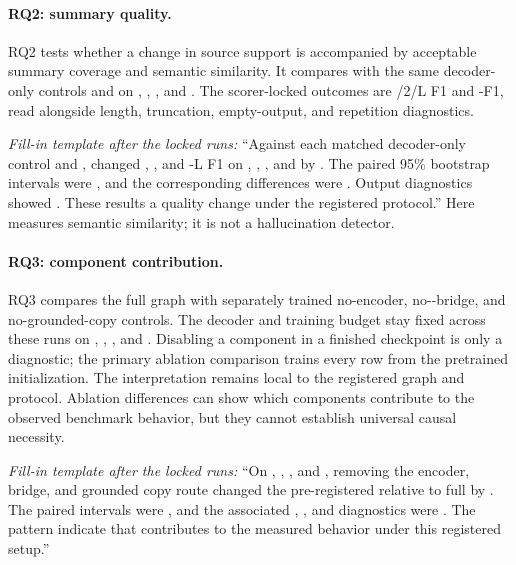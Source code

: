 \paragraph{RQ2: summary quality.}
RQ2 tests whether a change in source support is accompanied by acceptable
summary coverage and semantic similarity.  It compares \EviSeq with the same
decoder-only controls and \TfiveGemma on \PubMed, \ArXiv, \BookSum, and
\GovReport.  The scorer-locked outcomes are /2/L F1 and
\BERTScore-F1, read alongside length, truncation, empty-output, and repetition
diagnostics.

\emph{Fill-in template after the locked runs:} ``Against each matched
decoder-only control and \TfiveGemma, \EviSeq changed , , and
\Rouge-L F1 on \PubMed, \ArXiv, \BookSum, and \GovReport by
.  The paired 95\% bootstrap intervals were
, and the corresponding \BERTScore differences were
.  Output diagnostics showed .  These results  a quality change under the registered protocol.''  Here
\BERTScore measures semantic similarity; it is not a hallucination detector.

\paragraph{RQ3: component contribution.}
RQ3 compares the full \EviSeq graph with separately trained no-encoder,
no-\AFMR-bridge, and no-grounded-copy controls.  The decoder and training
budget stay fixed across these runs on \PubMed, \ArXiv, \BookSum, and
\GovReport.  Disabling a component in a finished checkpoint is only a
diagnostic; the primary ablation comparison trains every row from the
pretrained initialization.  The interpretation remains local to the
registered graph and protocol.  Ablation differences can show which
components contribute to the observed benchmark behavior, but they cannot
establish universal causal necessity.

\emph{Fill-in template after the locked runs:} ``On \PubMed, \ArXiv,
\BookSum, and \GovReport, removing the encoder, \AFMR bridge, and grounded
copy route changed the pre-registered  relative to
full \EviSeq by .  The paired intervals were
, and the associated \Rouge, \AlignScore, and \BERTScore
diagnostics were .  The pattern  indicate that
 contributes to the measured behavior under this registered
setup.''

